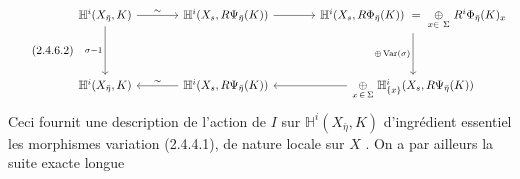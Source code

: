 \begin{equation}\tag{2.4.6.2}
\begin{tikzcd}[column sep=large, row sep=huge]
\mathbb{H}^i(X_{\bar\eta}, K) \arrow[r, "\sim"] \arrow[d, "\sigma-1"'] & \mathbb{H}^i(X_s, R\Psi_{\bar\eta}(K)) \arrow[r] & \mathbb{H}^i(X_s, R\Phi_{\bar\eta}(K)) \ =\ \underset{x\in\ \Sigma}{\oplus}\ R^i\Phi_{\bar\eta}(K)_x \arrow[d, "{\oplus\, \mathrm{Var}(\sigma)}"'] \\
\mathbb{H}^i(X_{\bar\eta}, K) & \mathbb{H}^i(X_s, R\Psi_{\bar\eta}(K)) \arrow[l, "\sim"'] & \underset{x\, \in\, \Sigma}{\oplus}\ \mathbb{H}^i_{\{x\}}(X_s, R\Psi_{\bar\eta}(K)) \arrow[l]
\end{tikzcd}
\end{equation}
Ceci fournit une description de l'action de $I$ sur $\mathbb{H}^i(X_{\bar\eta}, K)$ d'ingrédient essentiel les morphismes variation (2.4.4.1), de nature locale sur $X$ . On a par ailleurs la suite exacte longue


